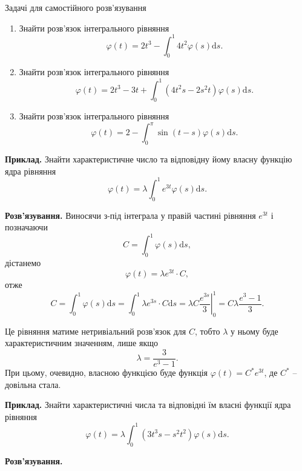 \documentclass[14pt,twoside]{extreport}
\theoremstyle{mystyle}
\newcommand{\problems}{\bigskip\noindent\fbox{\HandPencilLeft}\hspace{6pt}\textsf{Задачі
		для самостійного розв'язування}}
\numberwithin{equation}{chapter}
\begin{document}
\begin{small}
\problems
\begin{enumerate}
	\item Знайти розв'язок інтегрального рівняння
	\[
	\varphi(t) = 2 t^3 - \int_{0}^{1} 4t^2 \varphi(s) \mathrm{d}s.
	\]
	\item Знайти розв'язок інтегрального рівняння
	\[
	\varphi(t) = 2 t^3 - 3t + \int_{0}^{1} \left(4t^2 s - 2 s^2 t\right) \varphi(s) \mathrm{d}s.
	\]
	\item Знайти розв'язок інтегрального рівняння
	\[
	\varphi(t) = 2 - \int_{0}^{\pi} \sin (t-s) \varphi(s) \mathrm{d}s.
	\]
\end{enumerate} 

\textbf{Приклад.} Знайти характеристичне число та відповідну йому власну функцію ядра рівняння
\[
\varphi(t) = \lambda \int_{0}^{1} e^{3t} \varphi(s) \mathrm{d}s.
\]

\textbf{Розв'язування.}
Виносячи з-під інтеграла у правій частині рівняння $e^{3t}$ і позначаючи
\[
C=\int_{0}^{1} \varphi(s) \mathrm{d}s,
\]
дістанемо
\[
\varphi(t) = \lambda e^{3t} \cdot C,
\]
отже
\[
C=\int_{0}^{1} \varphi(s) \mathrm{d}s = \int_{0}^{1} \lambda e^{3s} \cdot C \mathrm{d}s = \lambda C \left. \dfrac{e^{3s}}{3}\right|_{0}^{1} = C \lambda \dfrac{e^{3}-1}{3}.
\]

Це рівняння матиме нетривіальний розв'язок для $C$, тобто $\lambda$ у ньому буде характеристичним значенням, лише якщо
\[
\lambda = \dfrac{3}{e^{3}-1}.
\]
При цьому, очевидно, власною функцією буде функція $\varphi(t) = C^* e^{3t}$, де $C^*$ -- довільна стала.

\textbf{Приклад.} Знайти характеристичні числа та відповідні їм власні функції ядра рівняння
\[
\varphi(t) = \lambda \int_{0}^{1} \left(3t^3s - s^2 t^2\right) \varphi(s) \mathrm{d}s.
\]

\textbf{Розв'язування.}


\end{small}
\end{document}
